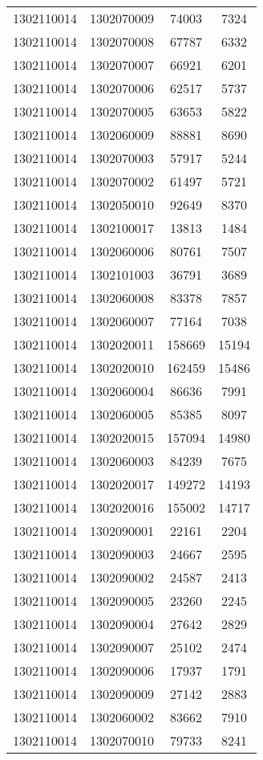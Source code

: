 \begin{longtable}[h]{llcc}
		1302110014 & 1302070009 & 74003 & 7324\\
		1302110014 & 1302070008 & 67787 & 6332\\
		1302110014 & 1302070007 & 66921 & 6201\\
		1302110014 & 1302070006 & 62517 & 5737\\
		1302110014 & 1302070005 & 63653 & 5822\\
		1302110014 & 1302060009 & 88881 & 8690\\
		1302110014 & 1302070003 & 57917 & 5244\\
		1302110014 & 1302070002 & 61497 & 5721\\
		1302110014 & 1302050010 & 92649 & 8370\\
		1302110014 & 1302100017 & 13813 & 1484\\
		1302110014 & 1302060006 & 80761 & 7507\\
		1302110014 & 1302101003 & 36791 & 3689\\
		1302110014 & 1302060008 & 83378 & 7857\\
		1302110014 & 1302060007 & 77164 & 7038\\
		1302110014 & 1302020011 & 158669 & 15194\\
		1302110014 & 1302020010 & 162459 & 15486\\
		1302110014 & 1302060004 & 86636 & 7991\\
		1302110014 & 1302060005 & 85385 & 8097\\
		1302110014 & 1302020015 & 157094 & 14980\\
		1302110014 & 1302060003 & 84239 & 7675\\
		1302110014 & 1302020017 & 149272 & 14193\\
		1302110014 & 1302020016 & 155002 & 14717\\
		1302110014 & 1302090001 & 22161 & 2204\\
		1302110014 & 1302090003 & 24667 & 2595\\
		1302110014 & 1302090002 & 24587 & 2413\\
		1302110014 & 1302090005 & 23260 & 2245\\
		1302110014 & 1302090004 & 27642 & 2829\\
		1302110014 & 1302090007 & 25102 & 2474\\
		1302110014 & 1302090006 & 17937 & 1791\\
		1302110014 & 1302090009 & 27142 & 2883\\
		1302110014 & 1302060002 & 83662 & 7910\\
		1302110014 & 1302070010 & 79733 & 8241\\

\end{longtable}
